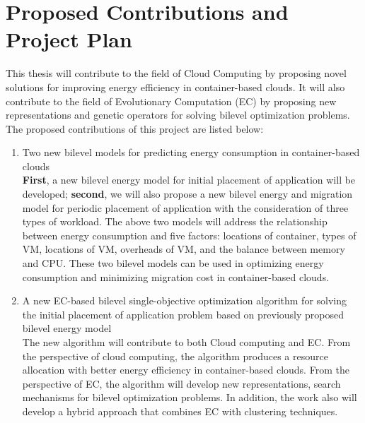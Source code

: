 \chapter{Proposed Contributions and Project Plan}\label{C:con}

This thesis will contribute to the field of Cloud Computing by proposing novel solutions for improving energy efficiency in container-based clouds. It will also contribute to the field of Evolutionary Computation (EC) by proposing new representations and genetic operators for solving bilevel optimization problems. The proposed contributions of this project are listed below:
 
\begin{enumerate}
	\item Two new bilevel models for predicting energy consumption in container-based clouds \\

	 \textbf{First}, a new bilevel energy model for initial placement of application will be developed; \textbf{second}, we will also propose a new bilevel energy and migration model for periodic placement of application with the consideration of three types of workload. The above two models will address the relationship between energy consumption and five factors: locations of container, types of VM, locations of VM, overheads of VM, and the balance between memory and CPU.  
	These two bilevel models can be used in optimizing energy consumption and minimizing migration cost in container-based clouds.

	\item A new EC-based bilevel single-objective optimization algorithm for solving the initial placement of application problem based on previously proposed bilevel energy model \\

	The new algorithm will contribute to both Cloud computing and EC. From the perspective of cloud computing, the algorithm produces a resource allocation with better energy efficiency in container-based clouds. From the perspective of EC, the algorithm will develop new representations, search mechanisms for bilevel optimization problems. In addition, the work also will develop a hybrid approach that combines EC with clustering techniques.


\end{enumerate}
